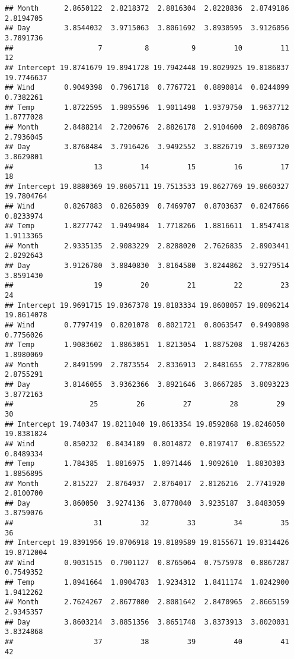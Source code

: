 \documentclass[
]{article}
\begin{document}
\begin{verbatim}
## Month      2.8650122  2.8218372  2.8816304  2.8228836  2.8749186  2.8194705
## Day        3.8544032  3.9715063  3.8061692  3.8930595  3.9126056  3.7891736
##                    7          8          9         10         11         12
## Intercept 19.8741679 19.8941728 19.7942448 19.8029925 19.8186837 19.7746637
## Wind       0.9049398  0.7961718  0.7767721  0.8890814  0.8244099  0.7382261
## Temp       1.8722595  1.9895596  1.9011498  1.9379750  1.9637712  1.8777028
## Month      2.8488214  2.7200676  2.8826178  2.9104600  2.8098786  2.7936045
## Day        3.8768484  3.7916426  3.9492552  3.8826719  3.8697320  3.8629801
##                   13         14         15         16         17         18
## Intercept 19.8880369 19.8605711 19.7513533 19.8627769 19.8660327 19.7804764
## Wind       0.8267883  0.8265039  0.7469707  0.8703637  0.8247666  0.8233974
## Temp       1.8277742  1.9494984  1.7718266  1.8816611  1.8547418  1.9113365
## Month      2.9335135  2.9083229  2.8288020  2.7626835  2.8903441  2.8292643
## Day        3.9126780  3.8840830  3.8164580  3.8244862  3.9279514  3.8591430
##                   19         20         21         22         23         24
## Intercept 19.9691715 19.8367378 19.8183334 19.8608057 19.8096214 19.8614078
## Wind       0.7797419  0.8201078  0.8021721  0.8063547  0.9490898  0.7756026
## Temp       1.9083602  1.8863051  1.8213054  1.8875208  1.9874263  1.8980069
## Month      2.8491599  2.7873554  2.8336913  2.8481655  2.7782896  2.8755291
## Day        3.8146055  3.9362366  3.8921646  3.8667285  3.8093223  3.8772163
##                  25         26         27         28         29         30
## Intercept 19.740347 19.8211040 19.8613354 19.8592868 19.8246050 19.8381824
## Wind       0.850232  0.8434189  0.8014872  0.8197417  0.8365522  0.8489334
## Temp       1.784385  1.8816975  1.8971446  1.9092610  1.8830383  1.8856895
## Month      2.815227  2.8764937  2.8764017  2.8126216  2.7741920  2.8100700
## Day        3.860050  3.9274136  3.8778040  3.9235187  3.8483059  3.8759076
##                   31         32         33         34         35         36
## Intercept 19.8391956 19.8706918 19.8189589 19.8155671 19.8314426 19.8712004
## Wind       0.9031515  0.7901127  0.8765064  0.7575978  0.8867287  0.7549352
## Temp       1.8941664  1.8904783  1.9234312  1.8411174  1.8242900  1.9412262
## Month      2.7624267  2.8677080  2.8081642  2.8470965  2.8665159  2.9345357
## Day        3.8603214  3.8851356  3.8651748  3.8373913  3.8020031  3.8324868
##                   37         38         39         40         41         42

\end{verbatim}
\end{document}
